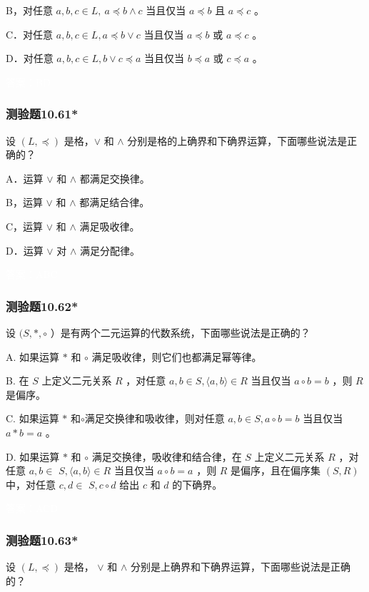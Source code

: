 \documentclass[UTF8, heading=true]{ctexart}
\begin{document}
B，对任意 $a, b, c \in L, ~ a \preceq b \wedge c$ 当且仅当 $a \preceq b$ 且 $a \preceq c$ 。

C．对任意 $a, b, c \in L, a \preceq b \vee c$ 当且仅当 $a \preceq b$ 或 $a \preceq c$ 。

D．对任意 $a, b, c \in L,  b \vee c \preceq a$ 当且仅当 $b \preceq a$ 或 $c \preceq a$ 。

\textcolor{white}{答案：BD}

\subsubsection{测验题10.61*}

设 $(L, \preceq)$ 是格，$\vee$ 和 $\wedge$ 分别是格的上确界和下确界运算，下面哪些说法是正确的？

A．运算 $\vee$ 和 $\wedge$ 都满足交换律。

B，运算 $\vee$ 和 $\wedge$ 都满足结合律。

C，运算 $\vee$ 和 $\wedge$ 满足吸收律。

D．运算 $\vee$ 对 $\wedge$ 满足分配律。

\textcolor{white}{答案：ABC}

\subsubsection{测验题10.62*}

设 $(S, *, \circ$ ）是有两个二元运算的代数系统，下面哪些说法是正确的？

A. 如果运算 $*$ 和 $\circ$ 满足吸收律，则它们也都满足幂等律。

B. 在 $S$ 上定义二元关系 $R$ ，对任意 $a, b \in S,\langle a, b\rangle \in R$ 当且仅当 $a \circ b=b$ ，则 $R$ 是偏序。

C. 如果运算 $*$ 和$\circ$满足交换律和吸收律，则对任意 $a, b \in S, a \circ b=b$ 当且仅当 $a * b=a$ 。

D. 如果运算 $*$ 和 $\circ$ 满足交换律，吸收律和结合律，在 $S$ 上定义二元关系 $R$ ，对任意 $a, b \in$
$S,\langle a, b\rangle \in R$ 当且仅当 $a \circ b=a$ ，则 $R$ 是偏序，且在偏序集 $(S, R)$ 中，对任意 $c, d \in$ $S, c \circ d$ 给出 $c$ 和 $d$ 的下确界。


\textcolor{white}{答案：ACD}

\subsubsection{测验题10.63*}

设 $(L, \preceq)$ 是格， $\vee$ 和 $\wedge$ 分别是上确界和下确界运算，下面哪些说法是正确的？
\end{document}
